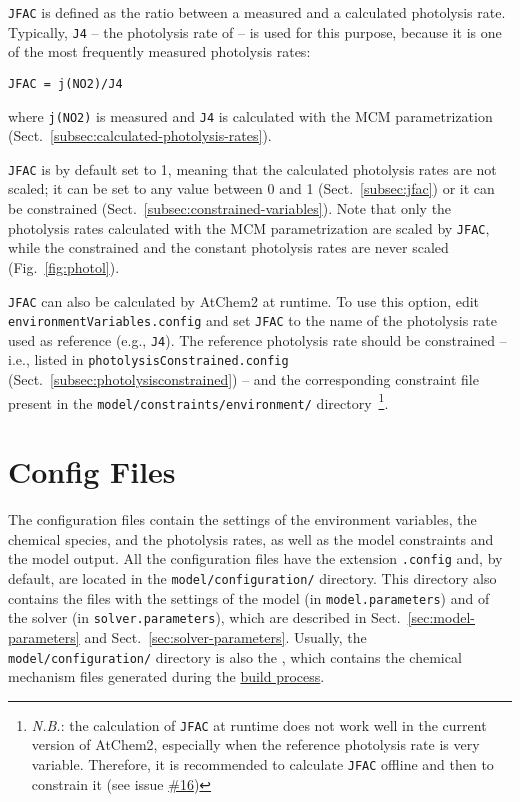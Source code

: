 \texttt{JFAC} is defined as the ratio between a measured and a
calculated photolysis rate. Typically, \texttt{J4} -- the photolysis
rate of  -- is used for this purpose, because it is one of the
most frequently measured photolysis rates:

\begin{verbatim}
JFAC = j(NO2)/J4
\end{verbatim}

where \texttt{j(NO2)} is measured and \texttt{J4} is calculated with
the MCM parametrization (Sect.~\ref{subsec:calculated-photolysis-rates}).

\texttt{JFAC} is by default set to 1, meaning that the calculated
photolysis rates are not scaled; it can be set to any value between 0
and 1 (Sect.~\ref{subsec:jfac}) or it can be constrained
(Sect.~\ref{subsec:constrained-variables}). Note that only the
photolysis rates calculated with the MCM parametrization are scaled by
\texttt{JFAC}, while the constrained and the constant photolysis rates
are never scaled (Fig.~\ref{fig:photol}).

\texttt{JFAC} can also be calculated by AtChem2 at runtime. To use
this option, edit \texttt{environmentVariables.config} and set
\texttt{JFAC} to the name of the photolysis rate used as reference
(e.g., \texttt{J4}). The reference photolysis rate should be
constrained -- i.e., listed in \texttt{photolysisConstrained.config}
(Sect.~\ref{subsec:photolysisconstrained}) -- and the corresponding
constraint file present in the \texttt{model/constraints/environment/}
directory~\footnote{\textit{N.B.}: the calculation of \texttt{JFAC} at
  runtime does not work well in the current version of AtChem2,
  especially when the reference photolysis rate is very
  variable. Therefore, it is recommended to calculate \texttt{JFAC}
  offline and then to constrain it (see issue
  \href{https://github.com/AtChem/AtChem2/issues/16}{\#16})}.

\section{Config Files} \label{sec:config-files}

The configuration files contain the settings of the environment
variables, the chemical species, and the photolysis rates, as well as
the model constraints and the model output. All the configuration
files have the extension \texttt{.config} and, by default, are located
in the \texttt{model/configuration/} directory. This directory also
contains the files with the settings of the model (in
\texttt{model.parameters}) and of the solver (in
\texttt{solver.parameters}), which are described in
Sect.~\ref{sec:model-parameters} and Sect.~\ref{sec:solver-parameters}.
Usually, the \texttt{model/configuration/} directory is also the
\sharedir, which contains the chemical mechanism files generated
during the \hyperref[subsec:build-process]{build process}.

